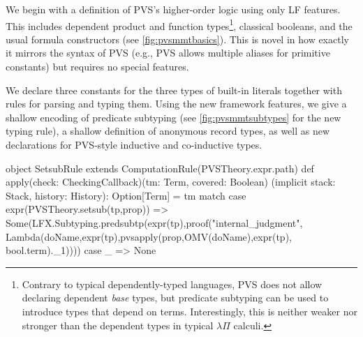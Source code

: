 We begin with a definition of PVS's higher-order logic using only LF features.  This
includes dependent product and function types\footnote{Contrary to typical
  dependently-typed languages, PVS does not allow declaring dependent \emph{base} types,
  but predicate subtyping can be used to introduce types that depend on
  terms. Interestingly, this is neither weaker nor stronger than the dependent types in
  typical $\lambda\Pi$ calculi.}, classical booleans, and the usual formula constructors
(see \autoref{fig:pvsmmtbasics}).  This is novel in how exactly it mirrors the syntax
of PVS (e.g., PVS allows multiple aliases for primitive constants) but requires no special
\mmt features.

We declare three constants for the three types of built-in literals together with \mmt
rules for parsing and typing them.  Using the new framework features, we give a shallow
encoding of predicate subtyping (see \autoref{fig:pvsmmtsubtypes} for the new typing
rule), a shallow definition of anonymous record types, as well as new declarations for
PVS-style inductive and co-inductive types.

\begin{scalacode}[caption={PVS-Style Predicate Subtyping in MMT and the Corresponding Rule \protect\footnotemark},label=fig:pvsmmtsubtypes]
object SetsubRule extends ComputationRule(PVSTheory.expr.path) {
  def apply(check: CheckingCallback)(tm: Term, covered: Boolean)
    (implicit stack: Stack, history: History): Option[Term]
   = tm match {
    case expr(PVSTheory.setsub(tp,prop)) => 
      Some(LFX.Subtyping.predsubtp(expr(tp),proof("internal_judgment",
        Lambda(doName,expr(tp),pvsapply(prop,OMV(doName),expr(tp),
        		bool.term)._1))))
    case _ => None
  }
}
\end{scalacode}
